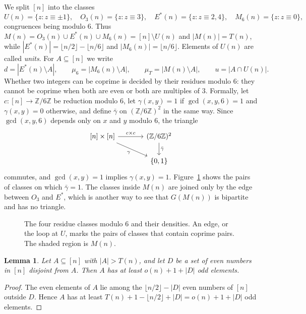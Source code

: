 \documentclass[11pt,a4paper]{article}
\newtheorem{lemma}[theorem]{Lemma}
\theoremstyle{definition}
\theoremstyle{remark}
\newcommand{\Es}{E^{*}}
\begin{document}
We split $[n]$ into the classes
\[
  U(n)=\{z:z\equiv\pm1\},\quad O_3(n)=\{z:z\equiv 3\},\quad \Es(n)=\{z:z\equiv2,4\},\quad
  M_6(n)=\{z:z\equiv0\},
\]
congruences being modulo $6$. Thus $M(n)=O_3(n)\cup\Es(n)\cup M_6(n)=[n]\setminus U(n)$ and
$|M(n)|=T(n)$, while $|\Es(n)|=\lfloor n/2\rfloor-\lfloor n/6\rfloor$ and
$|M_6(n)|=\lfloor n/6\rfloor$. Elements of $U(n)$ are called \emph{units}. For $A\subseteq[n]$ we
write
\[
  d=|\Es(n)\setminus A|,\qquad \mu_6=|M_6(n)\setminus A|,\qquad \mu_T=|M(n)\setminus A|,\qquad
  u=|A\cap U(n)|.
\]
Whether two integers can be coprime is decided by their residues modulo $6$: they cannot be coprime
when both are even or both are multiples of $3$. Formally, let $c\colon[n]\to\mathbb{Z}/6\mathbb{Z}$
be reduction modulo $6$, let $\gamma(x,y)=1$ if $\gcd(x,y,6)=1$ and $\gamma(x,y)=0$ otherwise, and
define $\bar\gamma$ on $(\mathbb{Z}/6\mathbb{Z})^2$ in the same way. Since $\gcd(x,y,6)$ depends only on
$x$ and $y$ modulo $6$, the triangle
\begin{equation}\label{cd:classes}
\begin{tikzcd}[column sep=large]
  {[n]\times[n]} \arrow[r, "c\times c"] \arrow[dr, "\gamma"'] & (\mathbb{Z}/6\mathbb{Z})^2
  \arrow[d, "\bar\gamma"] \\
  & \{0,1\}
\end{tikzcd}
\end{equation}
commutes, and $\gcd(x,y)=1$ implies $\gamma(x,y)=1$. Figure~\ref{fig:classes} shows the pairs of
classes on which $\bar\gamma=1$. The classes inside $M(n)$ are joined only by the edge between $O_3$ and
$\Es$, which is another way to see that $G(M(n))$ is bipartite and has no triangle.

\begin{figure}[t]
\centering

\caption{The four residue classes modulo $6$ and their densities. An edge, or the loop at $U$, marks
the pairs of classes that contain coprime pairs. The shaded region is $M(n)$.}
\label{fig:classes}
\end{figure}

\begin{lemma}\label{lem:odd}
Let $A\subseteq[n]$ with $|A|>T(n)$, and let $D$ be a set of even numbers in $[n]$ disjoint from $A$.
Then $A$ has at least $o(n)+1+|D|$ odd elements.
\end{lemma}

\begin{proof}
The even elements of $A$ lie among the $\lfloor n/2\rfloor-|D|$ even numbers of $[n]$ outside $D$.
Hence $A$ has at least $T(n)+1-\lfloor n/2\rfloor+|D|=o(n)+1+|D|$ odd elements.
\end{proof}
\end{document}
